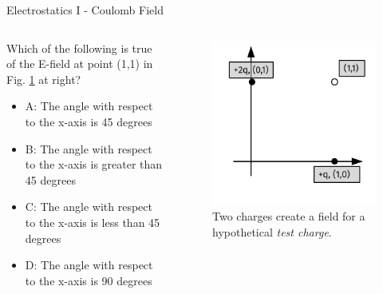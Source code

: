 \documentclass{beamer}
\begin{document}
\begin{frame}{Electrostatics I - Coulomb Field}
\small
\begin{columns}[T]
\begin{column}{0.5\textwidth}
Which of the following is true of the E-field at point (1,1) in Fig. \ref{fig:netfield3} at right?
\begin{itemize}
\item A: The angle with respect to the x-axis is 45 degrees
\item B: The angle with respect to the x-axis is greater than 45 degrees
\item C: The angle with respect to the x-axis is less than 45 degrees
\item D: The angle with respect to the x-axis is 90 degrees
\end{itemize}
\end{column}
\begin{column}{0.5\textwidth}
\begin{figure}
\includegraphics[width=\textwidth]{figures/NetField3.pdf}
\caption{\label{fig:netfield3} Two charges create a field for a hypothetical \textit{test charge}.}
\end{figure}
\end{column}
\end{columns}
\end{frame}
\end{document}
